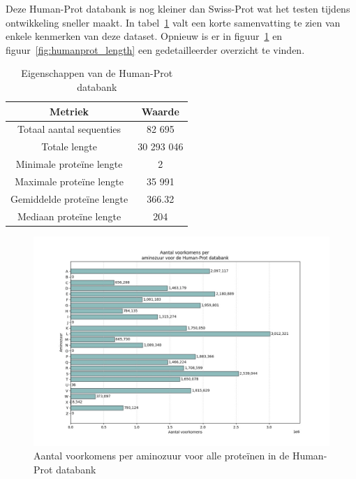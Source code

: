 \documentclass[11pt,dutch,faculty=we,layout=titlefont,underline=false,titleUppercase=true,titleUnderline=true]{ugent2016-report}
\begin{document}
    Deze Human-Prot databank is nog kleiner dan Swiss-Prot wat het testen tijdens ontwikkeling sneller maakt.
    In tabel~\ref{tab:humanprot_eigenschappen} valt een korte samenvatting te zien van enkele kenmerken van deze dataset.
    Opnieuw is er in figuur~\ref{fig:humanprot_aminozuur} en figuur~\ref{fig:humanprot_length} een gedetailleerder overzicht te vinden.

    \begin{table}[h!]
        \centering
        \begin{tabular}{ c c }
            Metriek                    & Waarde     \\
            \hline\hline
            Totaal aantal sequenties   & 82 695     \\
            Totale lengte              & 30 293 046 \\
            Minimale proteïne lengte   & 2          \\
            Maximale proteïne lengte   & 35 991     \\
            Gemiddelde proteïne lengte & 366.32     \\
            Mediaan proteïne lengte    & 204        \\
            \hline
        \end{tabular}
        \caption{Eigenschappen van de Human-Prot databank}
        \label{tab:humanprot_eigenschappen}
    \end{table}

    \begin{figure}[H]
        \centering
        \includegraphics[width=0.7\linewidth]{humanprot_aminozuur_voorkomens}
        \caption{Aantal voorkomens per aminozuur voor alle proteïnen in de Human-Prot databank}
        \label{fig:humanprot_aminozuur}
    \end{figure}
\end{document}
